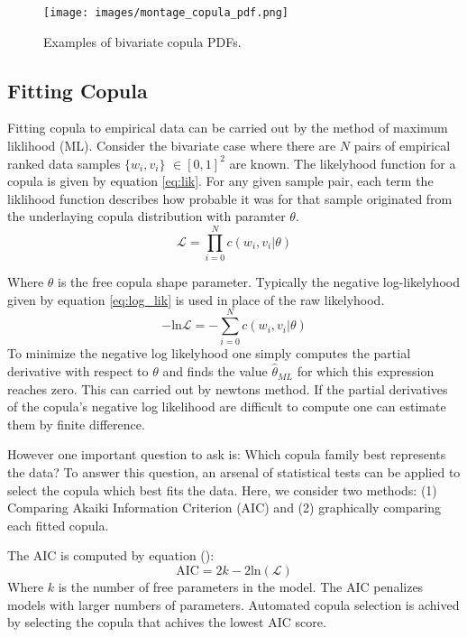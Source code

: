 \begin{figure}[!htbp]
\centering
\texttt{[image: images/montage\_copula\_pdf.png]}
\caption{Examples of bivariate copula PDFs.}
\label{fig:montage_cop}
\end{figure}

\subsection*{Fitting Copula}

Fitting copula to empirical data can be carried out by the method of maximum liklihood (ML).  Consider the bivariate case where there are $N$ pairs of empirical ranked data samples $\{w_i, v_i\}$ $\in [0,1]^2$ are known. The likelyhood function for a copula is given by equation \ref{eq:lik}.  For any given sample pair, each term the liklihood function describes how probable it was for that sample originated from the underlaying copula distribution with paramter $\theta$.
\begin{equation}
\mathcal{L}= \prod_{i=0}^N c(w_i, v_i|\theta)
\label{eq:lik}
\end{equation}

Where $\theta$ is the free copula shape parameter.
Typically the negative log-likelyhood given by equation \ref{eq:log_lik} is used in place of the raw likelyhood.  
\begin{equation}
-\mathrm{ln}\mathcal{L}= -\sum_{i=0}^N c(w_i, v_i|\theta)
\label{eq:log_lik}
\end{equation}
To minimize the negative log likelyhood one simply computes the partial derivative with respect to $\theta$ and finds the value $\hat \theta_{ML}$ for which this expression reaches zero.  This can carried out by newtons method.  If the partial derivatives of the copula's negative log likelihood are difficult to compute one can estimate them by finite difference. 

However one important question to ask is: Which copula family best represents the data?  To answer this question, an arsenal of statistical tests can be applied to select the copula which best fits the data.  Here, we consider two methods:  (1) Comparing Akaiki Information Criterion (AIC) and (2) graphically comparing each fitted copula.  

The AIC is computed by equation ():
\begin{equation}
\mathrm{AIC} = 2k - 2\mathrm{ln}(\mathcal{L})
\end{equation}
Where $k$ is the number of free parameters in the model.  The AIC penalizes models with larger numbers of parameters. 
Automated copula selection is achived by selecting the copula that achives the lowest AIC score.

